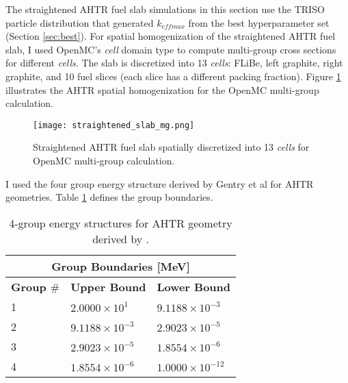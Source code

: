 The straightened AHTR fuel slab simulations in this section use the \gls{TRISO} 
particle distribution that generated $k_{eff max}$ from the best hyperparameter 
set (Section \ref{sec:best}). 
For spatial homogenization of the straightened \gls{AHTR} fuel slab, I used 
OpenMC's \textit{cell} domain type to compute multi-group cross sections for 
different \textit{cells}. 
The slab is discretized into 13 \textit{cells}: FLiBe, left graphite, right 
graphite, and 10 fuel slices (each slice has a different packing fraction). 
Figure \ref{fig:straightened_slab_mg} illustrates the \gls{AHTR} spatial 
homogenization for the OpenMC multi-group calculation. 
\begin{figure}[]
    \centering
    \texttt{[image: straightened\_slab\_mg.png]}
    \raggedright
    \caption{Straightened \acrfull{AHTR} fuel slab spatially discretized into 
    13 \textit{cells} for OpenMC multi-group calculation.}
    \label{fig:straightened_slab_mg}
\end{figure}
I used the four group energy structure derived by Gentry et al 
\cite{gentry_development_2016} for \gls{AHTR} geometries. 
Table \ref{tab:energy_structures} defines the group boundaries. 
\begin{table}[]
    \centering
    \onehalfspacing
    \caption{4-group energy structures for \acrfull{AHTR} geometry 
    derived by \cite{gentry_development_2016}.}
	\label{tab:energy_structures}
    \footnotesize
    \begin{tabular}{lll}
    \hline
    \multicolumn{3}{c}{\textbf{Group Boundaries [MeV]}} \\ 
    \hline
    \textbf{Group $\#$}& \textbf{Upper Bound} & \textbf{Lower Bound}  \\
    \hline 
    1 & $2.0000\times 10^1$ & $9.1188\times 10^{-3}$ \\ 
    2 & $9.1188\times 10^{-3}$ & $2.9023\times 10^{-5}$\\
    3 & $2.9023\times 10^{-5}$ & $1.8554\times 10^{-6}$\\
    4 & $1.8554\times 10^{-6}$ & $1.0000\times 10^{-12}$\\
    \hline
    \end{tabular}
\end{table}

